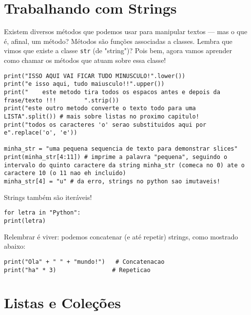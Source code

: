 \documentclass[12pt]{book}
\begin{document}
	\chapter{Trabalhando com Strings}
	
	Existem diversos métodos que podemos usar para manipular textos — mas o que é, afinal, um método?  
	Métodos são funções associadas a classes. Lembra que vimos que existe a classe \texttt{str} (de "string")? Pois bem, agora vamos aprender como chamar os métodos que atuam sobre essa classe!

	
\begin{lstlisting}[caption={Métodos com string}]
print("ISSO AQUI VAI FICAR TUDO MINUSCULO!".lower())
print("e isso aqui, tudo maiusculo!!".upper())
print("    este metodo tira todos os espacos antes e depois da frase/texto !!!        ".strip())
print("este outro metodo converte o texto todo para uma LISTA".split()) # mais sobre listas no proximo capitulo!
print("todos os caracteres 'o' serao substituidos aqui por e".replace('o', 'e'))

minha_str = "uma pequena sequencia de texto para demonstrar slices"
print(minha_str[4:11]) # imprime a palavra "pequena", seguindo o intervalo do quinto caractere da string minha_str (comeca no 0) ate o caractere 10 (o 11 nao eh incluido)
minha_str[4] = "u" # da erro, strings no python sao imutaveis!
\end{lstlisting}

Strings também são iteráveis!

\begin{lstlisting}[caption={Iterando sobre strings}]
for letra in "Python":
print(letra)
\end{lstlisting}

Relembrar é viver: podemos concatenar (e até repetir) strings, como mostrado abaixo:

\begin{lstlisting}[caption={Concatenação e repetição de strings}]
print("Ola" + " " + "mundo!")   # Concatenacao
print("ha" * 3)                # Repeticao
\end{lstlisting}

	\chapter{Listas e Coleções}
	
\end{document}
